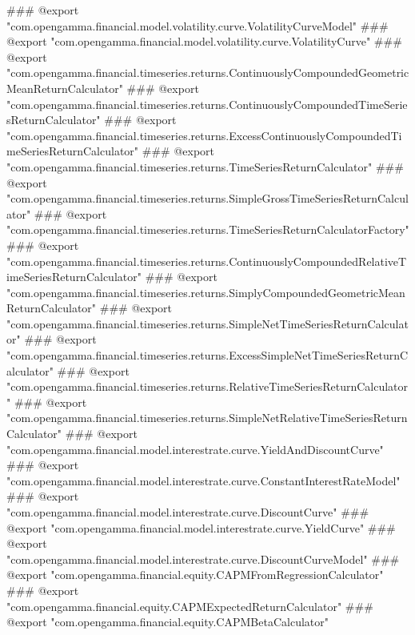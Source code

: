 ### @export "com.opengamma.financial.model.volatility.curve.VolatilityCurveModel"
### @export "com.opengamma.financial.model.volatility.curve.VolatilityCurve"
### @export "com.opengamma.financial.timeseries.returns.ContinuouslyCompoundedGeometricMeanReturnCalculator"
### @export "com.opengamma.financial.timeseries.returns.ContinuouslyCompoundedTimeSeriesReturnCalculator"
### @export "com.opengamma.financial.timeseries.returns.ExcessContinuouslyCompoundedTimeSeriesReturnCalculator"
### @export "com.opengamma.financial.timeseries.returns.TimeSeriesReturnCalculator"
### @export "com.opengamma.financial.timeseries.returns.SimpleGrossTimeSeriesReturnCalculator"
### @export "com.opengamma.financial.timeseries.returns.TimeSeriesReturnCalculatorFactory"
### @export "com.opengamma.financial.timeseries.returns.ContinuouslyCompoundedRelativeTimeSeriesReturnCalculator"
### @export "com.opengamma.financial.timeseries.returns.SimplyCompoundedGeometricMeanReturnCalculator"
### @export "com.opengamma.financial.timeseries.returns.SimpleNetTimeSeriesReturnCalculator"
### @export "com.opengamma.financial.timeseries.returns.ExcessSimpleNetTimeSeriesReturnCalculator"
### @export "com.opengamma.financial.timeseries.returns.RelativeTimeSeriesReturnCalculator"
### @export "com.opengamma.financial.timeseries.returns.SimpleNetRelativeTimeSeriesReturnCalculator"
### @export "com.opengamma.financial.model.interestrate.curve.YieldAndDiscountCurve"
### @export "com.opengamma.financial.model.interestrate.curve.ConstantInterestRateModel"
### @export "com.opengamma.financial.model.interestrate.curve.DiscountCurve"
### @export "com.opengamma.financial.model.interestrate.curve.YieldCurve"
### @export "com.opengamma.financial.model.interestrate.curve.DiscountCurveModel"
### @export "com.opengamma.financial.equity.CAPMFromRegressionCalculator"
### @export "com.opengamma.financial.equity.CAPMExpectedReturnCalculator"
### @export "com.opengamma.financial.equity.CAPMBetaCalculator"
